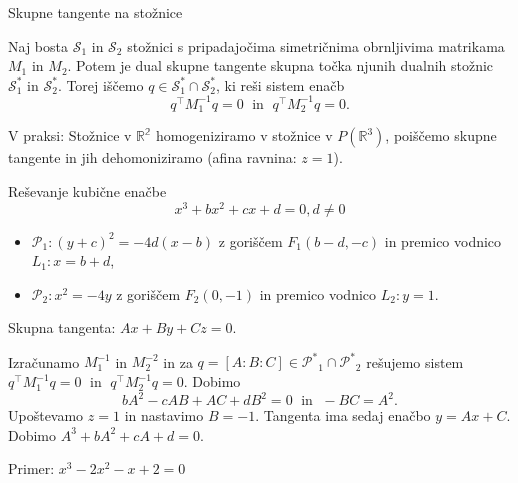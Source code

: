 \documentclass{beamer}
\begin{document}

\begin{frame}{Skupne tangente na stožnice}
    \begin{alertblock}{}
        Naj bosta $\mathcal{S}_1$ in $\mathcal{S}_2$ stožnici s pripadajočima simetričnima obrnljivima matrikama $M_1$ in $M_2$. Potem je dual skupne tangente skupna točka njunih dualnih stožnic $\mathcal{S}^*_1$ in $\mathcal{S}^*_2$. Torej iščemo $q \in \mathcal{S}^*_1 \cap \mathcal{S}^*_2$, ki reši sistem enačb
        $$ q^\intercal M^{-1}_1 q = 0 \; \text{ in } \; q^\intercal M^{-1}_2 q = 0.$$
    \end{alertblock}
    V praksi: Stožnice v $\mathbb{R^2}$ homogeniziramo v stožnice v $P(\mathbb{R}^3)$, poiščemo skupne tangente in jih dehomoniziramo (afina ravnina: $z=1$).
\end{frame}


\begin{frame}{Reševanje kubične enačbe}
    $$ x^3 + bx^2 + cx + d = 0, d \neq 0$$

    \begin{itemize}
        \item $\mathcal{P}_1: (y+c)^2 = -4d(x-b)$ z goriščem $F_1 (b - d, -c)$ in premico vodnico $L_1: x = b + d$,
        \item $\mathcal{P}_2: x^2 = -4y$ z goriščem $F_2 (0, -1)$ in premico vodnico $L_2: y = 1$.
    \end{itemize}
    Skupna tangenta: $Ax + By + Cz = 0$.

    Izračunamo $M_1^{-1}$ in $M_2^{-2}$ in za $q = [A:B:C] \in \mathcal{P^*}_1 \cap \mathcal{P^*}_2$ rešujemo sistem $q^\intercal M^{-1}_1 q = 0 \; \text{ in } \; q^\intercal M^{-1}_2 q = 0$. Dobimo
    $$ bA^2 - cAB + AC + dB^2 = 0 \; \text{ in } \; -BC = A^2.$$
    Upoštevamo $z=1$ in nastavimo $B=-1$. Tangenta ima sedaj enačbo $y = Ax + C$. Dobimo $A^3 + bA^2 + cA + d = 0$.

    Primer: $x^3 - 2x^2 - x + 2 = 0$
\end{frame}

\end{document}

